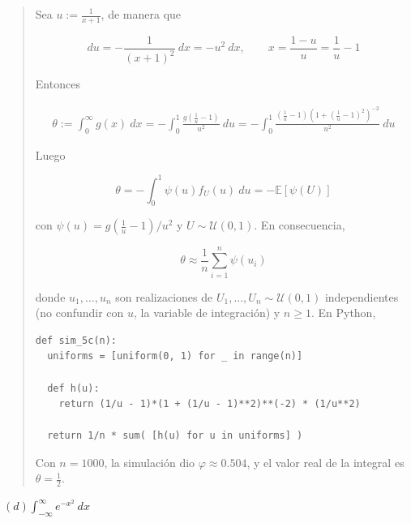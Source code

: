 \documentclass[a4paper, 12pt]{article}
\begin{document}
\small
\begin{quote}

Sea $u := \frac{1}{x + 1}$, de manera que 

\begin{equation*}
  du = -\frac{1}{(x+1)^2} ~ dx = -u^2 ~ dx, \qquad x = \frac{1-u}{u} =
  \frac{1}{u} - 1
\end{equation*}

Entonces 

\begin{align*}
  \theta := \int_0^\infty g(x) ~ dx = -\int_0^1 \frac{g(\frac{1}{u} - 1)}{u^2}
  ~ du = -\int_0^1 \frac{(\frac{1}{u} - 1)(1 + (\frac{1}{u} - 1)^2)^{-2}}{u^2} ~
  du
\end{align*}

Luego 

\begin{equation*}
  \theta = -\int_0^1 \psi(u) f_U(u) ~ du = -\mathbb{E}\left[ \psi(U) \right] 
\end{equation*}

con $\psi(u) = g(\frac{1}{u} - 1) / u^2$ y $U \sim \mathcal{U}(0, 1)$. En
consecuencia, 

\begin{equation*}
  \theta \approx \frac{1}{n}\sum_{i=1}^n \psi(u_i)
\end{equation*}

donde $u_1, \ldots, u_n$ son realizaciones de $U_1, \ldots, U_n \sim
\mathcal{U}(0, 1)$ independientes (no confundir con $u$, la variable de
integración) y $n \geq 1$. En Python, 

\footnotesize 

\begin{verbatim}
def sim_5c(n):
  uniforms = [uniform(0, 1) for _ in range(n)]

  def h(u):
    return (1/u - 1)*(1 + (1/u - 1)**2)**(-2) * (1/u**2)

  return 1/n * sum( [h(u) for u in uniforms] )
\end{verbatim}

\small 

Con $n = 1000$, la simulación dio $\varphi \approx 0.504$, y el valor real de la
integral es $\theta = \frac{1}{2}$.


\end{quote}
\normalsize

\pagebreak
\pagebreak

$(d) \int_{-\infty}^\infty e^{-x^2} ~ dx$
\end{document}
